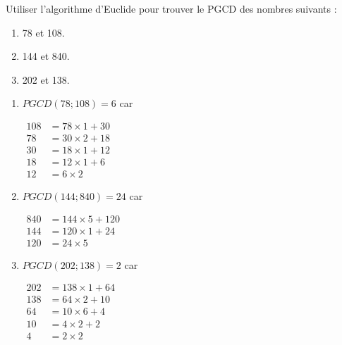 \documentclass{cornouaille}
\begin{document}
\begin{exercice}
  Utiliser l'algorithme d'Euclide pour trouver le PGCD des nombres
  suivants :


\begin{multicols}{2}
\begin{enumerate}
\item 78 et 108.
\item 144 et 840.
\item 202 et 138.
\end{enumerate}
\end{multicols}
\end{exercice}
\begin{solution}
  \begin{enumerate}
  \item $PGCD(78;108)=6$ car

    $\begin{aligned}
      108&=78\times1+30\\
      78&=30\times2+18\\
      30&=18\times1+12\\
      18&=12\times1+6\\
      12&=6\times2\end{aligned}$\medskip
    
  \item $PGCD(144;840)=24$ car
    
    $\begin{aligned}
      840&=144\times5+120\\
      144&=120\times1+24\\
      120&=24\times5\end{aligned}$\medskip
    
    
    
  \item $PGCD(202;138)=2$ car

    $\begin{aligned}
      202&=138\times1+64\\
      138&=64\times2+10\\
      64&=10\times6+4\\
      10&=4\times2+2\\
      4&=2\times2\end{aligned}$
    

    
  \end{enumerate}
\end{solution}
\end{document}
